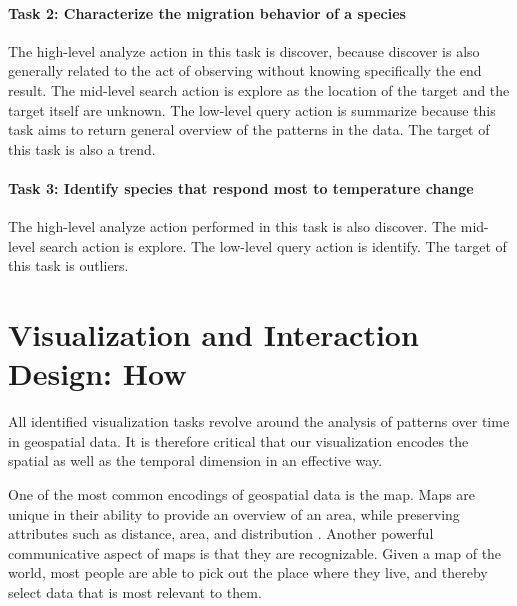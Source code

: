 \documentclass[journal]{vgtc}                %
\begin{document}
\paragraph{Task 2: Characterize the migration behavior of a species} The high-level analyze action in this task is discover, because discover is also generally related to the act of observing without knowing specifically the end result. The mid-level search action is explore as the location of the target and the target itself are unknown. The low-level query action is summarize because this task aims to return general overview of the patterns in the data. The target of this task is also a trend.

\paragraph{Task 3: Identify species that respond most to temperature change} The high-level analyze action performed in this task is also discover. The mid-level search action is explore. The low-level query action is identify. The target of this task is outliers.

\section{Visualization and Interaction Design: How}


All identified visualization tasks revolve around the analysis of patterns over time in geospatial data. It is therefore critical that our visualization encodes the spatial as well as the temporal dimension in an effective way.

One of the most common encodings of geospatial data is the map. Maps are unique in their ability to provide an overview of an area, while preserving attributes such as distance, area, and distribution \cite{kraak2020cartography}. Another powerful communicative aspect of maps is that they are recognizable. Given a map of the world, most people are able to pick out the place where they live, and thereby select data that is most relevant to them.
\end{document}
